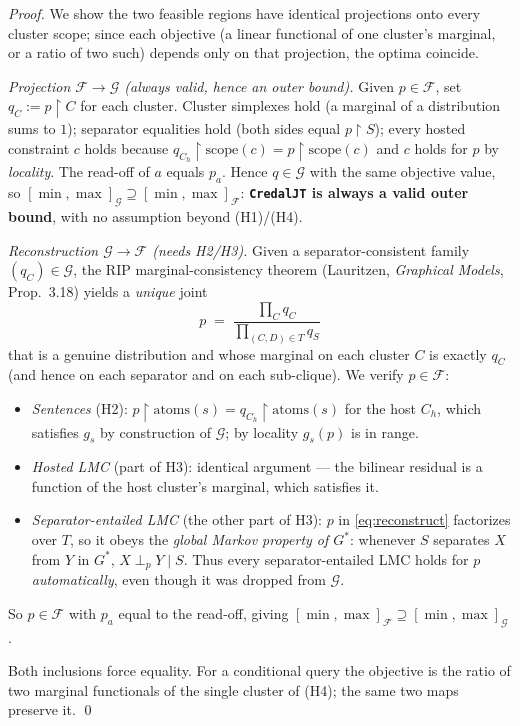 \documentclass[11pt]{article}
\begin{document}
\begin{proof}
We show the two feasible regions have identical projections onto every cluster scope; since each
objective (a linear functional of one cluster's marginal, or a ratio of two such) depends only on
that projection, the optima coincide.

\emph{Projection $\mathcal F\to\mathcal G$ (always valid, hence an outer bound).}
Given $p\in\mathcal F$, set $q_C:=p{\restriction}C$ for each cluster. Cluster simplexes hold (a
marginal of a distribution sums to $1$); separator equalities hold (both sides equal
$p{\restriction}S$); every hosted constraint $c$ holds because $q_{C_h}{\restriction}\mathrm{scope}(c)
=p{\restriction}\mathrm{scope}(c)$ and $c$ holds for $p$ by \emph{locality}. The read-off of $a$
equals $p_a$. Hence $q\in\mathcal G$ with the same objective value, so
$[\min,\max]_{\mathcal G}\supseteq[\min,\max]_{\mathcal F}$: \textbf{\texttt{CredalJT} is always a
valid outer bound}, with no assumption beyond (H1)/(H4).

\emph{Reconstruction $\mathcal G\to\mathcal F$ (needs H2/H3).}
Given a separator-consistent family $(q_C)\in\mathcal G$, the RIP marginal-consistency theorem
(Lauritzen, \emph{Graphical Models}, Prop.~3.18) yields a \emph{unique} joint
\begin{equation}\label{eq:reconstruct}
  p \;=\; \frac{\prod_{C} q_C}{\prod_{(C,D)\in T} q_{S}}
\end{equation}
that is a genuine distribution and whose marginal on each cluster $C$ is exactly $q_C$ (and hence on
each separator and on each sub-clique). We verify $p\in\mathcal F$:
\begin{itemize}\itemsep1pt
  \item \emph{Sentences} (H2): $p{\restriction}\mathrm{atoms}(s)=q_{C_h}{\restriction}\mathrm{atoms}(s)$
    for the host $C_h$, which satisfies $g_s$ by construction of $\mathcal G$; by locality $g_s(p)$ is
    in range.
  \item \emph{Hosted LMC} (part of H3): identical argument --- the bilinear residual is a function of
    the host cluster's marginal, which satisfies it.
  \item \emph{Separator-entailed LMC} (the other part of H3): $p$ in \eqref{eq:reconstruct}
    factorizes over $T$, so it obeys the \emph{global Markov property of $G^\ast$}: whenever $S$
    separates $X$ from $Y$ in $G^\ast$, $X\perp_{p}Y\mid S$. Thus every separator-entailed LMC holds
    for $p$ \emph{automatically}, even though it was dropped from $\mathcal G$.
\end{itemize}
So $p\in\mathcal F$ with $p_a$ equal to the read-off, giving
$[\min,\max]_{\mathcal F}\supseteq[\min,\max]_{\mathcal G}$.

Both inclusions force equality. For a conditional query the objective is the ratio of two marginal
functionals of the single cluster of (H4); the same two maps preserve it. \qed
\end{proof}
\end{document}
